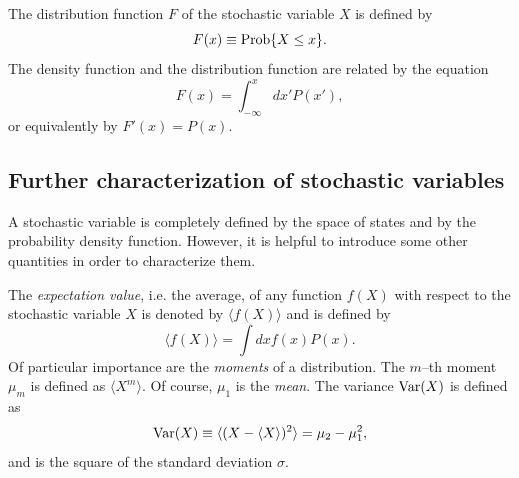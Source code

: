 The distribution function $F$ of the stochastic variable $X$ is 
defined by 
\begin{equation}
F(x) \equiv {\rm Prob}\{X \le x\}.
\end{equation}
The density function and the distribution function are related by 
the equation
\begin{equation}
F(x) = \int_{-\infty}^x dx' P(x'),
\end{equation}
or equivalently by $F'(x)= P(x)$.

\subsection{Further characterization of stochastic variables}
A stochastic variable is completely defined by the space of states 
and by the probability density function. However, it is helpful to 
introduce some other quantities in order to characterize them.

The {\em expectation value}, i.e. the average,  of any function $f(X)$ 
with respect to the stochastic variable $X$ is denoted by
$\langle f(X) \rangle$ and is defined by
\begin{equation}
\langle f(X) \rangle = \int dx f(x) P(x).
\end{equation}
Of particular importance are the {\em moments} of a distribution. The 
$m$--th moment $\mu_m$ is defined as $\langle X^m \rangle$. Of 
course, $\mu_1$ is the {\em mean}. The variance ${\rm Var}(X)$ 
is defined as
\begin{equation}
{\rm Var}(X) \equiv \langle (X - \langle X \rangle )^2\rangle
   = \mu_2 - \mu_1^2,
\end{equation}
and is the square of the standard deviation $\sigma$.

